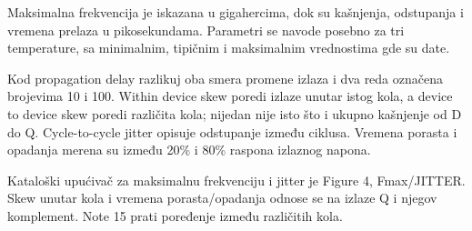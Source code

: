 Maksimalna frekvencija je iskazana u gigahercima, dok su kašnjenja, odstupanja i vremena prelaza u pikosekundama. Parametri se navode posebno za tri temperature, sa minimalnim, tipičnim i maksimalnim vrednostima gde su date.

Kod propagation delay razlikuj oba smera promene izlaza i dva reda označena brojevima 10 i 100. Within device skew poredi izlaze unutar istog kola, a device to device skew poredi različita kola; nijedan nije isto što i ukupno kašnjenje od D do Q. Cycle-to-cycle jitter opisuje odstupanje između ciklusa. Vremena porasta i opadanja merena su između 20\% i 80\% raspona izlaznog napona.

Kataloški upućivač za maksimalnu frekvenciju i jitter je Figure 4, Fmax/JITTER. Skew unutar kola i vremena porasta/opadanja odnose se na izlaze Q i njegov komplement. Note 15 prati poređenje između različitih kola.
